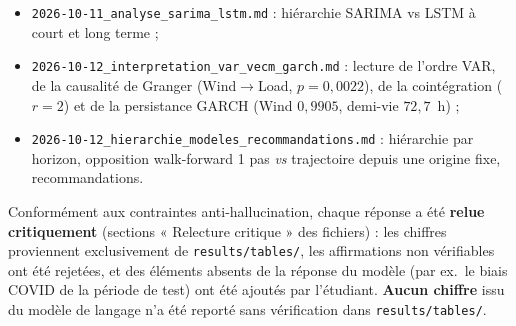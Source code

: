 \begin{itemize}
  \item \texttt{2026-10-11\_analyse\_sarima\_lstm.md} : hiérarchie
        SARIMA vs LSTM à court et long terme ;
  \item \texttt{2026-10-12\_interpretation\_var\_vecm\_garch.md} : lecture de
        l'ordre VAR, de la causalité de Granger (Wind$\to$Load,
        $p=0{,}0022$), de la cointégration ($r=2$) et de la persistance
        GARCH (Wind $0{,}9905$, demi-vie $72{,}7$~h) ;
  \item \texttt{2026-10-12\_hierarchie\_modeles\_recommandations.md} :
        hiérarchie par horizon, opposition walk-forward 1 pas
        \emph{vs} trajectoire depuis une origine fixe, recommandations.
\end{itemize}

Conformément aux contraintes anti-hallucination, chaque réponse a été
\textbf{relue critiquement} (sections « Relecture critique » des fichiers) :
les chiffres proviennent exclusivement de \texttt{results/tables/}, les
affirmations non vérifiables ont été rejetées, et des éléments absents de la
réponse du modèle (par ex.\ le biais COVID de la période de test) ont été
ajoutés par l'étudiant. \textbf{Aucun chiffre} issu du modèle de langage n'a
été reporté sans vérification dans \texttt{results/tables/}.
